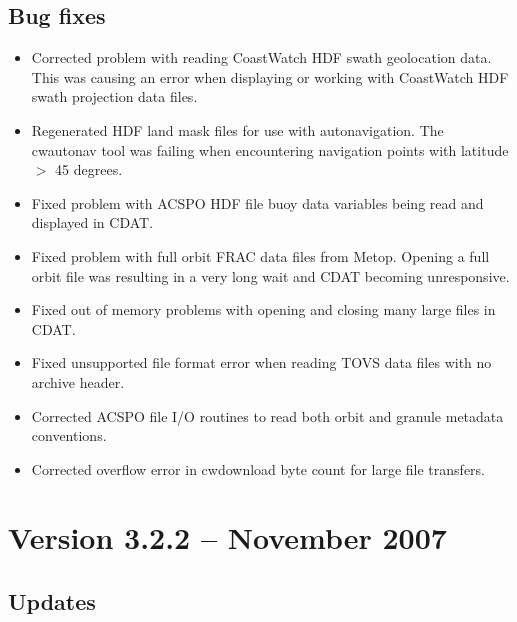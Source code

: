 \subsection*{ Bug fixes}
\begin{itemize}

  \item Corrected problem with reading CoastWatch HDF swath
    geolocation data.  This was causing an error when displaying
    or working with CoastWatch HDF swath projection data files.

  \item Regenerated HDF land mask files for use with
    autonavigation.  The cwautonav tool was failing when
    encountering navigation points with latitude $>$ 45 degrees.

  \item Fixed problem with ACSPO HDF file buoy data variables
    being read and displayed in CDAT.

  \item Fixed problem with full orbit FRAC data files from Metop.
    Opening a full orbit file was resulting in a very long wait
    and CDAT becoming unresponsive.

  \item Fixed out of memory problems with opening and closing
    many large files in CDAT.

  \item Fixed unsupported file format error when reading TOVS
    data files with no archive header.

  \item Corrected ACSPO file I/O routines to read both orbit and
    granule metadata conventions.

  \item Corrected overflow error in cwdownload byte count for
    large file transfers.

\end{itemize}


\section{Version 3.2.2 -- November 2007}

\subsection*{ Updates}

